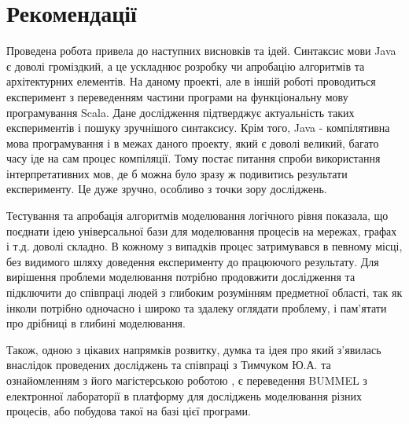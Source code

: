\documentclass[12pt,a4paper]{article}
\begin{document}
\clearpage

\section{Рекомендації}

Проведена робота привела до наступних висновків та ідей. Синтаксис мови Java є доволі громіздкий, а це ускладнює розробку чи апробацію алгоритмів та архітектурних елементів. На даному проекті, але в іншій роботі проводиться експеримент з переведенням частини програми на функціональну мову програмування Scala. Дане дослідження підтверджує актуальність таких експериментів і пошуку зручнішого синтаксису. Крім того, Java - компілятивна мова програмування і в межах даного проекту, який є доволі великий, багато часу іде на сам процес компіляції. Тому постає питання спроби використання інтерпретативних мов, де б можна було зразу ж подивитись результати експерименту. Це дуже зручно, особливо з точки зору досліджень.

Тестування та апробація алгоритмів моделювання логічного рівня показала, що поєднати ідею універсальної бази для моделювання процесів на мережах, графах і т.д. доволі складно. В кожному з випадків процес затримувався в певному місці, без видимого шляху доведення експерименту до працюючого результату. Для вирішення проблеми моделювання потрібно продовжити дослідження та підключити до співпраці людей з глибоким розумінням предметної області, так як інколи потрібно одночасно і широко та здалеку оглядати проблему, і пам’ятати про дрібниці в глибині моделювання.

Також, одною з цікавих напрямків розвитку, думка та ідея про який з’явилась внаслідок проведених досліджень та співпраці з Тимчуком Ю.А. та ознайомленням з його магістерською роботою \cite{thesis-Tymchuk}, є переведення BUMMEL з електронної лабораторії в платформу для досліджень моделювання різних процесів, або побудова такої на базі цієї програми.

\clearpage
\end{document}
